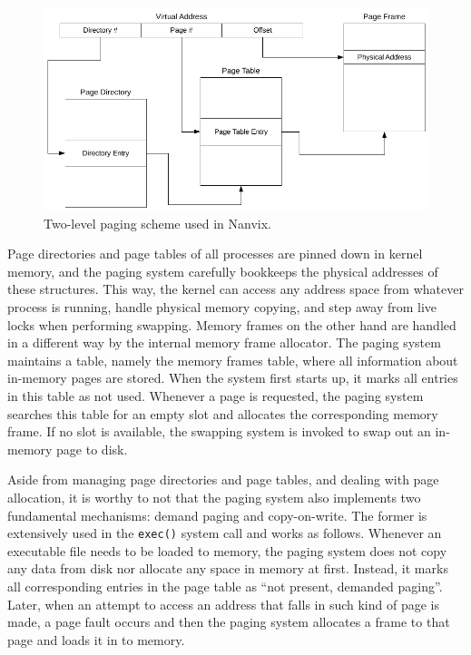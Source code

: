 \documentclass[10pt,a4paper]{article}
\begin{document}
\begin{figure}
	\centering
	\includegraphics[scale=0.85]{img/paging-scheme}
	\caption{Two-level paging scheme used in Nanvix.}
	\label{figure: paging scheme}
\end{figure}

Page directories and page tables of all processes are pinned down in kernel memory, and the paging system carefully bookkeeps the physical addresses of these structures. This way, the kernel can access any address space from whatever process is running, handle physical memory copying, and step away from live locks when performing swapping. Memory frames on the other hand are handled in a different way by the internal memory frame allocator. The paging system maintains a table, namely the memory frames table, where all information about in-memory pages are stored. When the system first starts up, it marks all entries in this table as not used. Whenever a page is requested, the paging system searches this table for an empty slot and allocates the corresponding memory frame. If no slot is available, the swapping system is invoked to swap out an in-memory page to disk.

Aside from managing page directories and page tables, and dealing with page allocation, it is worthy to not that the paging system also implements two fundamental mechanisms: demand paging and copy-on-write. The former is extensively used in the \texttt{exec()} system call and works as follows. Whenever an executable file needs to be loaded to memory, the paging system does not copy any data from disk nor allocate any space in memory at first. Instead, it marks all corresponding entries in the page table as ``not present, demanded paging''. Later, when an attempt to access an address that falls in such kind of page is made, a page fault occurs and then the paging system allocates a frame to that page and loads it in to memory. 
\end{document}
